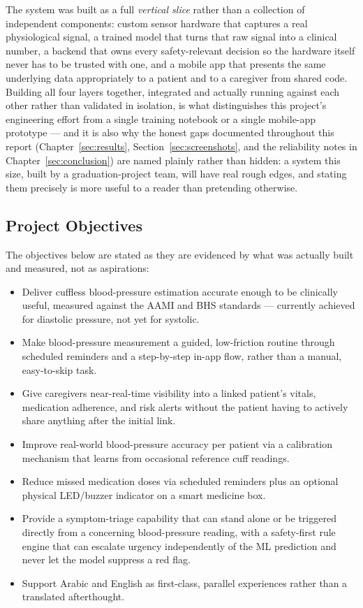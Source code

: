 \documentclass[12pt,a4paper]{report}
\begin{document}
The system was built as a full \emph{vertical slice} rather than a collection
of independent components: custom sensor hardware that captures a real
physiological signal, a trained model that turns that raw signal into a
clinical number, a backend that owns every safety-relevant decision so the
hardware itself never has to be trusted with one, and a mobile app that
presents the same underlying data appropriately to a patient and to a
caregiver from shared code. Building all four layers together, integrated and
actually running against each other rather than validated in isolation, is
what distinguishes this project's engineering effort from a single training
notebook or a single mobile-app prototype --- and it is also why the honest
gaps documented throughout this report (Chapter~\ref{sec:results},
Section~\ref{sec:screenshots}, and the reliability notes in
Chapter~\ref{sec:conclusion}) are named plainly rather than hidden: a system
this size, built by a graduation-project team, will have real rough edges, and
stating them precisely is more useful to a reader than pretending otherwise.

\subsection{Project Objectives}

The objectives below are stated as they are evidenced by what was actually
built and measured, not as aspirations:

\begin{itemize}[leftmargin=1.4em]
  \item Deliver cuffless blood-pressure estimation accurate enough to be
  clinically useful, measured against the AAMI and BHS standards --- currently
  achieved for diastolic pressure, not yet for systolic.
  \item Make blood-pressure measurement a guided, low-friction routine through
  scheduled reminders and a step-by-step in-app flow, rather than a manual,
  easy-to-skip task.
  \item Give caregivers near-real-time visibility into a linked patient's
  vitals, medication adherence, and risk alerts without the patient having to
  actively share anything after the initial link.
  \item Improve real-world blood-pressure accuracy per patient via a
  calibration mechanism that learns from occasional reference cuff readings.
  \item Reduce missed medication doses via scheduled reminders plus an optional
  physical LED/buzzer indicator on a smart medicine box.
  \item Provide a symptom-triage capability that can stand alone or be
  triggered directly from a concerning blood-pressure reading, with a
  safety-first rule engine that can escalate urgency independently of the ML
  prediction and never let the model suppress a red flag.
  \item Support Arabic and English as first-class, parallel experiences rather
  than a translated afterthought.
\end{itemize}
\end{document}
